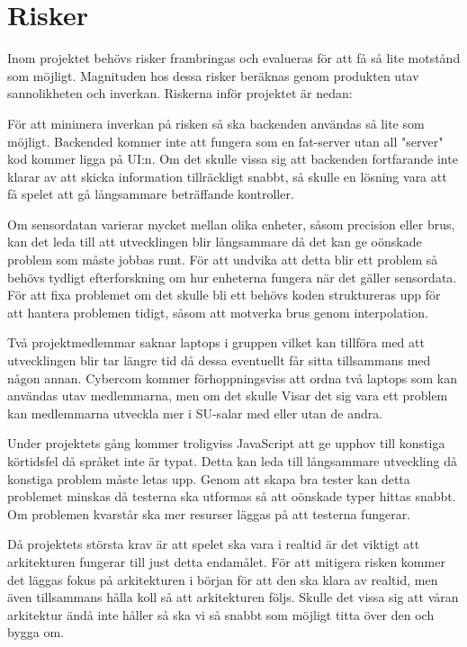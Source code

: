 \section{Risker}
Inom projektet behövs risker frambringas och evalueras för att få så lite motstånd som möjligt. 
Magnituden hos dessa risker beräknas genom produkten utav sannolikheten och inverkan. 
Riskerna inför projektet är nedan:

{
    För att minimera inverkan på risken så ska backenden användas så lite som möjligt.
    Backended kommer inte att fungera som en fat-server utan all "server" kod kommer ligga på UI:n. 
    Om det skulle vissa sig att backenden fortfarande inte klarar av att skicka information tillräckligt snabbt, 
    så skulle en lösning vara att få spelet att gå långsammare beträffande kontroller.
}

{
    Om sensordatan varierar mycket mellan olika enheter, såsom precision eller brus,
    kan det leda till att utvecklingen blir långsammare då det kan ge oönskade problem som måste jobbas runt.
    För att undvika att detta blir ett problem så behövs tydligt efterforskning om hur enheterna fungera när
    det gäller sensordata. För att fixa problemet om det skulle bli ett behövs koden struktureras upp för att
    hantera problemen tidigt, såsom att motverka brus genom interpolation.
}

{
    Två projektmedlemmar saknar laptops i gruppen vilket kan tillföra med att utvecklingen blir tar längre tid
    då dessa eventuellt får sitta tillsammans med någon annan.
    Cybercom kommer förhoppningsviss att ordna två laptops som kan användas utav medlemmarna, men om det skulle
    Visar det sig vara ett problem kan medlemmarna utveckla mer i SU-salar med eller utan de andra.
}

{
    Under projektets gång kommer troligviss JavaScript att ge upphov till konstiga körtidsfel då språket inte är typat.
    Detta kan leda till långsammare utveckling då konstiga problem måste letas upp.
    Genom att skapa bra tester kan detta problemet minskas då testerna ska utformas så att oönskade typer hittas snabbt.
    Om problemen kvarstår ska mer resurser läggas på att testerna fungerar.
}

{
    Då projektets största krav är att spelet ska vara i realtid är det viktigt att arkitekturen fungerar till just
    detta endamålet.
    För att mitigera risken kommer det läggas fokus på arkitekturen i början för att den ska klara av realtid, 
    men även tillsammans hålla koll så att arkitekturen följs.
    Skulle det vissa sig att våran arkitektur ändå inte håller så ska vi så snabbt som möjligt titta över den och bygga om.
}

